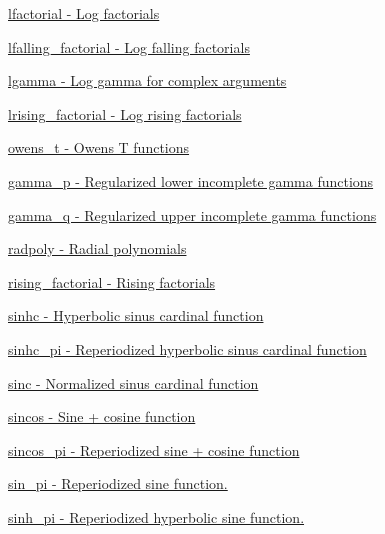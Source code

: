 \begin{DoxyItemize}
\item \hyperlink{group__gnu__math__spec__func_gab256f8d7b77b9a8fefafca21827166eb}{lfactorial -\/ Log factorials}
\item \hyperlink{group__gnu__math__spec__func_ga2032c10640d5010666d60d9faec86c32}{lfalling\+\_\+factorial -\/ Log falling factorials}
\item \hyperlink{group__gnu__math__spec__func_ga40fa5127f7c419ed1d8f1c6a6f96ea9b}{lgamma -\/ Log gamma for complex arguments}
\item \hyperlink{group__gnu__math__spec__func_ga8912b75b2f7592fb61128c766e7313b9}{lrising\+\_\+factorial -\/ Log rising factorials}
\item \hyperlink{group__gnu__math__spec__func_gab4e367aae19853cca3af99eead01fcaa}{owens\+\_\+t -\/ Owens T functions}
\item \hyperlink{group__gnu__math__spec__func_ga692601fa7508c0b97bf549e6362a49b9}{gamma\+\_\+p -\/ Regularized lower incomplete gamma functions}
\item \hyperlink{group__gnu__math__spec__func_ga10c246b2fa2ce000dc5d7c81e9e98c58}{gamma\+\_\+q -\/ Regularized upper incomplete gamma functions}
\item \hyperlink{group__gnu__math__spec__func_ga195db2592888b7a8df870d9eaeff8d05}{radpoly -\/ Radial polynomials}
\item \hyperlink{group__gnu__math__spec__func_gae8c36a0e1f60254cf212a3806f7c675c}{rising\+\_\+factorial -\/ Rising factorials}
\item \hyperlink{group__gnu__math__spec__func_gaf2f02e4143e7beb97352cef4b7fcb663}{sinhc -\/ Hyperbolic sinus cardinal function}
\item \hyperlink{group__gnu__math__spec__func_ga8bb6034e28d48879845bf64818cc06e1}{sinhc\+\_\+pi -\/ Reperiodized hyperbolic sinus cardinal function}
\item \hyperlink{group__gnu__math__spec__func_ga09976b5d041113979c93613cc3700348}{sinc -\/ Normalized sinus cardinal function}
\item \hyperlink{group__gnu__math__spec__func_ga8041c24b528475bcf8a4178e484652a3}{sincos -\/ Sine + cosine function}
\item \hyperlink{group__gnu__math__spec__func_ga6553883f127ea0de67041c3128e03813}{sincos\+\_\+pi -\/ Reperiodized sine + cosine function}
\item \hyperlink{group__gnu__math__spec__func_ga220f8a9a0477697cff96e84dc911d5f0}{sin\+\_\+pi -\/ Reperiodized sine function.}
\item \hyperlink{group__gnu__math__spec__func_gade43453b87b6b38c05b3fcce40870542}{sinh\+\_\+pi -\/ Reperiodized hyperbolic sine function.}

\end{DoxyItemize}
